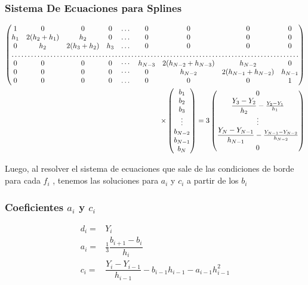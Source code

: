 \mode*
\begin{frame}[label=FrameSistemaEcuacionesSplines]
  \frametitle<presentation>{Sistema De Ecuaciones para Splines}

  \tiny
  \begin{equation}
   \begin{split}
      \begin{pmatrix}
	1 &     0      &    0    & 0 & \dots & 0 & 0 & 0 & 0 \\
	h_1& 2(h_2+h_1)& h_2     & 0 & \dots & 0 & 0 & 0 & 0 \\
	0  &  h_2  & 2(h_3+h_2) &h_3 & \dots & 0 & 0 & 0 & 0 \\
	\hdotsfor{9}\\
	0 & 0 & 0 & 0 & \cdots & h_{N-3} & 2(h_{N-2}+h_{N-3}) & h_{N-2} & 0 \\
	0 & 0 & 0 & 0 & \cdots & 0 & h_{N-2} &2(h_{N-1}+h_{N-2}) & h_{N-1} \\
	0 &     0      &    0    & 0 & \dots & 0 & 0 & 0 & 1
      \end{pmatrix} 
       \\
      \times 
      \begin{pmatrix}
	b_1 \\ b_2 \\ b_3 \\ \vdots \\ b_{N-2} \\ b_{N-1} \\ b_{N}
      \end{pmatrix} 
      = 
      3
      \begin{pmatrix}
	0 \\ 
	\dfrac{ Y_3 - Y_2 }{h_2} - \frac{ Y_2 - Y_1 }{h_1} \\
	\vdots \\
	\dfrac{ Y_N - Y_{N-1} }{h_{N-1}} - \frac{ Y_{N-1} - Y_{N-2} }{h_{N-2}} \\
	0
      \end{pmatrix}
    \end{split}
  \end{equation}
\end{frame}


Luego, al resolver el sistema de ecuaciones que sale de las condiciones
de borde para cada $f_i$ , tenemos las soluciones para $a_i$ y $c_i$ a partir de los 
$b_i$

\mode*

\begin{frame}[label=FrameEquationRecurrencias]
  \frametitle<presentation>{Coeficientes $a_i$ y $c_i$}
  \begin{equation}
    \begin{aligned}
      d_i =& Y_i \\
      a_i =& \frac{1}{3} \dfrac{ b_{i+1} - b_i }{h_i} \\
      c_i =& \dfrac{ Y_i - Y_{i-1} }{ h_{i-1} } - b_{i-1} h_{i-1}  - a_{i-1} h_{i-1} ^2
    \end{aligned}
  \end{equation}


\end{frame}

